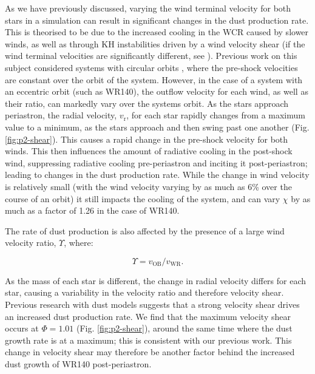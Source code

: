 \documentclass[fleqn,usenatbib]{mnras}
\newcommand{\rms}[1]{\ensuremath{_{\text{#1}}}}
\begin{document}
As we have previously discussed, varying the wind terminal velocity for both stars in a simulation can result in significant changes in the dust production rate.
This is theorised to be due to the increased cooling in the WCR caused by slower winds, as well as through KH instabilities driven by a wind velocity shear (if the wind terminal velocities are significantly different, see \cite{stevens_colliding_1992}).
Previous work on this subject considered systems with circular orbits \citep{eatsonExplorationDustGrain2022}, where the pre-shock velocities are constant over the orbit of the system.
However, in the case of a system with an eccentric orbit (such as WR140), the outflow velocity for each wind, as well as their ratio, can markedly vary over the systems orbit.
As the stars approach periastron, the radial velocity, $v\rms{r}$, for each star rapidly changes from a maximum value to a minimum, as the stars approach and then swing past one another (Fig. \ref{fig:p2-shear}).
This causes a rapid change in the pre-shock velocity for both winds.
This then influences the amount of radiative cooling in the post-shock wind, suppressing radiative cooling pre-periastron and inciting it post-periastron; leading to changes in the dust production rate. 
While the change in wind velocity is relatively small (with the wind velocity varying by as much as 6\% over the course of an orbit) it still impacts the cooling of the system, and can vary $\chi$ by as much as a factor of 1.26 in the case of WR140.

The rate of dust production is also affected by the presence of a large wind velocity ratio, $\Upsilon$, where:

\begin{equation}
  \Upsilon = v\rms{OB} / v\rms{WR} .
\end{equation}

\noindent
As the mass of each star is different, the change in radial velocity differs for each star, causing a variability in the velocity ratio and therefore velocity shear.
Previous research with dust models suggests that a strong velocity shear drives an increased dust production rate.
We find that the maximum velocity shear occurs at $\Phi = 1.01$ (Fig. \ref{fig:p2-shear}), around the same time where the dust growth rate is at a maximum; this is consistent with our previous work.
This change in velocity shear may therefore be another factor behind the increased dust growth of WR140 post-periastron.
\end{document}
